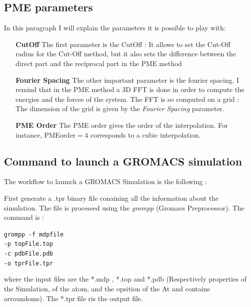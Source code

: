 \documentclass[10pt,twoside,a4paper]{report}
\begin{document}
	\subsection{PME parameters}
	
	In this paragraph I will explain the parameters it is possible to play with:
	
	\begin{enumerate}
	

	\item[\textbf{CutOff}] The first parameter is the CutOff : It allows to set the Cut-Off radius for the Cut-Off method, but it also sets the difference between the direct part and the reciprocal part in the PME method
	
	\item[\textbf{Fourier Spacing}] The other important parameter is the fourier spacing. I remind that in the PME method a 3D FFT is done in order to compute the energies and the forces of the system. The FFT is so computed on a grid : The dimension of the grid is given by the \textit{Fourier Spacing} parameter.
	
	\item[\textbf{PME Order}] The PME order gives the order of the interpolation. For instance, PMEorder$= 4$ corresponds to a cubic interpolation. 		
	
	\end{enumerate}
	
	\subsection{Command to launch a GROMACS simulation }	
	
The workflow to laumch a GROMACS Simulation is the following : 



First generate a .tpr binary file conaining all the information about the simulation. The file is processed using the \textit{grompp} (Gromacs Preprocessor). The command is :


{\centering\tt {grompp -f mdpfile \\
	 -p topFile.top \\
	 -c pdbFile.pdb \\
	 -o tprFile.tpr \\ 
 }}

\vspace{5mm}
where the input files are the *.mdp , *.top and *.pdb (Respectively properties of the Simulation, of the atom, and the opsition of the At and contains arroundoms). The *.tpr file ris the output file.
\end{document}
